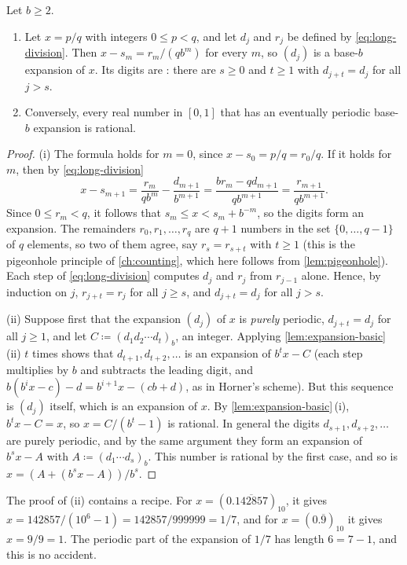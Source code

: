 \begin{theorem}
\label{thm:rational-expansion}
Let $b\ge2$.
\begin{enumerate}
\item Let $x=p/q$ with integers $0\le p<q$, and let $d_j$ and $r_j$ be defined by \eqref{eq:long-division}. Then $x-s_m=r_m/(qb^m)$ for every $m$, so $(d_j)$ is a base-$b$ expansion of $x$. Its digits are : there are $s\ge0$ and $t\ge1$ with $d_{j+t}=d_j$ for all $j>s$.
\item Conversely, every real number in $[0,1]$ that has an eventually periodic base-$b$ expansion is rational.
\end{enumerate}
\end{theorem}

\begin{proof}
(i) The formula holds for $m=0$, since $x-s_0=p/q=r_0/q$. If it holds for $m$, then by \eqref{eq:long-division}
\[
x-s_{m+1}=\frac{r_m}{qb^m}-\frac{d_{m+1}}{b^{m+1}}=\frac{br_m-qd_{m+1}}{qb^{m+1}}=\frac{r_{m+1}}{qb^{m+1}}.
\]
Since $0\le r_m<q$, it follows that $s_m\le x<s_m+b^{-m}$, so the digits form an expansion. The remainders $r_0,r_1,\ldots,r_q$ are $q+1$ numbers in the set $\{0,\ldots,q-1\}$ of $q$ elements, so two of them agree, say $r_s=r_{s+t}$ with $t\ge1$ (this is the pigeonhole principle of \cref{ch:counting}, which here follows from \cref{lem:pigeonhole}). Each step of \eqref{eq:long-division} computes $d_j$ and $r_j$ from $r_{j-1}$ alone. Hence, by induction on $j$, $r_{j+t}=r_j$ for all $j\ge s$, and $d_{j+t}=d_j$ for all $j>s$.

(ii) Suppose first that the expansion $(d_j)$ of $x$ is \emph{purely} periodic, $d_{j+t}=d_j$ for all $j\ge1$, and let $C\coloneqq(d_1d_2\cdots d_t)_b$, an integer. Applying \cref{lem:expansion-basic}\,(ii) $t$ times shows that $d_{t+1},d_{t+2},\ldots$ is an expansion of $b^tx-C$ (each step multiplies by $b$ and subtracts the leading digit, and $b(b^ix-c)-d=b^{i+1}x-(cb+d)$, as in Horner's scheme). But this sequence is $(d_j)$ itself, which is an expansion of $x$. By \cref{lem:expansion-basic}\,(i), $b^tx-C=x$, so $x=C/(b^t-1)$ is rational. In general the digits $d_{s+1},d_{s+2},\ldots$ are purely periodic, and by the same argument they form an expansion of $b^sx-A$ with $A\coloneqq(d_1\cdots d_s)_b$. This number is rational by the first case, and so is $x=(A+(b^sx-A))/b^s$.
\end{proof}

The proof of (ii) contains a recipe. For $x=(0.\overline{142857})_{10}$, it gives $x=142857/(10^6-1)=142857/999999=1/7$, and for $x=(0.\overline{9})_{10}$ it gives $x=9/9=1$. The periodic part of the expansion of $1/7$ has length $6=7-1$, and this is no accident.

